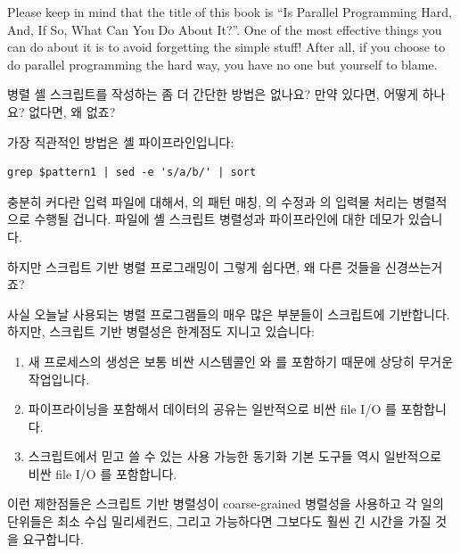 \begin{enumerate}
	Please keep in mind that the title of this book is
	``Is Parallel Programming Hard, And, If So, What Can You Do About It?''.
	One of the most effective things you can do about it is to
	avoid forgetting the simple stuff!
	After all, if you choose to do parallel programming the hard
	way, you have no one but yourself to blame.
	\fi

\QuickQ{}
	병렬 셸 스크립트를 작성하는 좀 더 간단한 방법은 없나요?
	만약 있다면, 어떻게 하나요? 없다면, 왜 없죠?

\QuickA{}
	가장 직관적인 방법은 셸 파이프라인입니다:

\vspace{5pt}
\begin{minipage}[t]{\columnwidth}
\small
\begin{verbatim}
grep $pattern1 | sed -e 's/a/b/' | sort
\end{verbatim}
\end{minipage}
\vspace{5pt}
	충분히 커다란 입력 파일에 대해서,  의 패턴 매칭,  의
	수정과  의 입력물 처리는 병렬적으로 수행될 겁니다.
	 파일에 셸 스크립트 병렬성과 파이프라인에 대한 데모가
	있습니다.

\QuickQ{}
	하지만 스크립트 기반 병렬 프로그래밍이 그렇게 쉽다면, 왜 다른 것들을
	신경쓰는거죠?

\QuickA{}
	사실 오늘날 사용되는 병렬 프로그램들의 매우 많은 부분들이 스크립트에
	기반합니다.
	하지만, 스크립트 기반 병렬성은 한계점도 지니고 있습니다:
	\begin{enumerate}
	\item	새 프로세스의 생성은 보통 비싼 시스템콜인  와
		 를 포함하기 때문에 상당히 무거운 작업입니다.
	\item	파이프라이닝을 포함해서 데이터의 공유는 일반적으로 비싼 file
		I/O 를 포함합니다.
	\item	스크립트에서 믿고 쓸 수 있는 사용 가능한 동기화 기본 도구들
		역시 일반적으로 비싼 file I/O 를 포함합니다.
	\end{enumerate}
	이런 제한점들은 스크립트 기반 병렬성이 coarse-grained 병렬성을 사용하고
	각 일의 단위들은 최소 수십 밀리세컨드, 그리고 가능하다면 그보다도 훨씬
	긴 시간을 가질 것을 요구합니다.


\end{enumerate}
